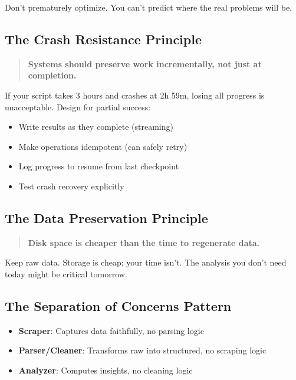 \documentclass[11pt,a4paper]{article}
\begin{document}
Don't prematurely optimize. You can't predict where the real problems will be.

\subsection{The Crash Resistance Principle}

\begin{quote}
\textbf{Systems should preserve work incrementally, not just at completion.}
\end{quote}

If your script takes 3 hours and crashes at 2h 59m, losing all progress is unacceptable. Design for partial success:

\begin{itemize}
    \item Write results as they complete (streaming)
    \item Make operations idempotent (can safely retry)
    \item Log progress to resume from last checkpoint
    \item Test crash recovery explicitly
\end{itemize}

\subsection{The Data Preservation Principle}

\begin{quote}
\textbf{Disk space is cheaper than the time to regenerate data.}
\end{quote}

Keep raw data. Storage is cheap; your time isn't. The analysis you don't need today might be critical tomorrow.

\subsection{The Separation of Concerns Pattern}

\begin{itemize}
    \item \textbf{Scraper}: Captures data faithfully, no parsing logic
    \item \textbf{Parser/Cleaner}: Transforms raw into structured, no scraping logic
    \item \textbf{Analyzer}: Computes insights, no cleaning logic
\end{itemize}
\end{document}
